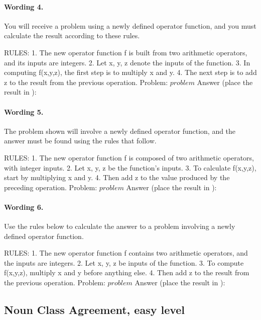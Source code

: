 \paragraph{Wording 4.}
\begin{promptbox}
You will receive a problem using a newly defined operator function, and you must calculate the result according to these rules.

RULES:
1. The new operator function f is built from two arithmetic operators, and its inputs are integers.
2. Let x, y, z denote the inputs of the function.
3. In computing f(x,y,z), the first step is to multiply x and y.
4. The next step is to add z to the result from the previous operation.
Problem: \({problem}\)
Answer (place the result in \boxed{}):\boxed{}
\end{promptbox}

\paragraph{Wording 5.}
\begin{promptbox}
The problem shown will involve a newly defined operator function, and the answer must be found using the rules that follow.

RULES:
1. The new operator function f is composed of two arithmetic operators, with integer inputs.
2. Let x, y, z be the function's inputs.
3. To calculate f(x,y,z), start by multiplying x and y.
4. Then add z to the value produced by the preceding operation.
Problem: \({problem}\)
Answer (place the result in \boxed{}):\boxed{}
\end{promptbox}

\paragraph{Wording 6.}
\begin{promptbox}
Use the rules below to calculate the answer to a problem involving a newly defined operator function.

RULES:
1. The new operator function f contains two arithmetic operators, and the inputs are integers.
2. Let x, y, z be inputs of the function.
3. To compute f(x,y,z), multiply x and y before anything else.
4. Then add z to the result from the previous operation.
Problem: \({problem}\)
Answer (place the result in \boxed{}):\boxed{}
\end{promptbox}

\subsection*{Noun Class Agreement, easy level}

